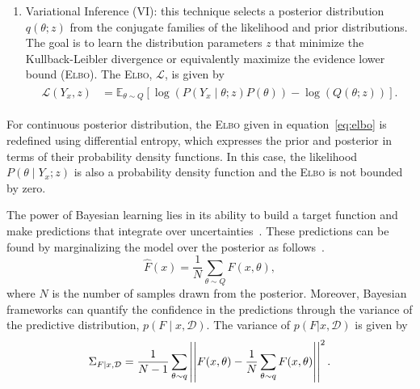 \begin{enumerate}
%
\item Variational Inference (VI): this technique selects a posterior
distribution $q(\theta;z)$ from the conjugate families of the likelihood and
prior distributions. The goal is to learn the distribution parameters $z$ that
minimize the Kullback-Leibler divergence or equivalently maximize the evidence
lower bound (\textsc{Elbo}). The \textsc{Elbo}, $\mathcal{L}$, is given
by~\cite{cohen2016bayesian}
\begin{align}
  \begin{split}
  \mathcal{L}(Y_x,z) &= \mathbb{E}_{\theta \sim Q} \left[\log(P(Y_x \mid \theta;z)P(\theta)) - \log(Q(\theta;z)) \right].
  \end{split}
  \label{eq:elbo}
\end{align}
\end{enumerate}
\begin{rem}
  For continuous posterior distribution, the \textsc{Elbo} given in
  equation~\eqref{eq:elbo} is redefined using differential entropy, which
  expresses the prior and posterior in terms of their probability density
  functions. In this case, the likelihood $P(\theta \mid Y_x;z)$ is also
  a probability density function and the \textsc{Elbo} is not bounded by zero.
\end{rem}

The power of Bayesian learning lies in its ability to build a target function
and make predictions that integrate over
uncertainties~\cite{tipping2003bayesian}. These predictions can be found by
marginalizing the model over the posterior as follows~\cite{jospin2020hands}.
\begin{equation}
  \hat{F}(x) = \frac{1}{N} \sum_{\theta \sim Q} F(x, \theta),
  \label{eqn:marginalization}
\end{equation} 
where $N$ is the number of samples drawn from the posterior. Moreover, Bayesian
frameworks can quantify the confidence in the predictions through the variance
of the predictive distribution, $p(F \mid x, \mathcal{D})$. The variance of
$p(F|x, \mathcal{D})$ is given by~\cite{jospin2020hands}
\begin{equation}
  \Sigma_{F \mid x,\mathcal{D}} = \frac{1}{N-1} \sum_{\theta \sim q} \left|\left|F(x,\theta) - \frac{1}{N} \sum_{\theta \sim q} F(x, \theta)\right|\right|^2.
  \label{eqn:predictive_variance}
\end{equation}
%

